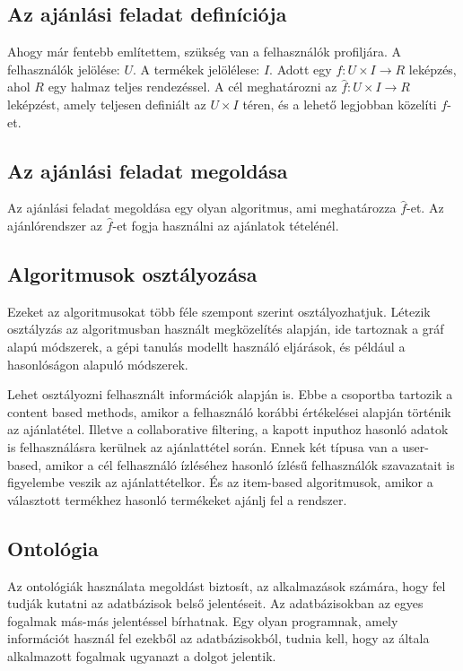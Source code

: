 \subsection{Az ajánlási feladat definíciója}

Ahogy már fentebb említettem, szükség van a felhasználók profiljára. A felhasználók jelölése: $U$. A termékek jelölélese: $I$. Adott egy $f: U \times I \rightarrow R$ leképzés, ahol $R$ egy halmaz teljes rendezéssel. A cél meghatározni az $\hat{f}: U \times I \rightarrow R$ leképzést, amely teljesen definiált az $U \times I$ téren, és a lehető legjobban közelíti $f$-et.

\subsection{Az ajánlási feladat megoldása}

Az ajánlási feladat megoldása egy olyan algoritmus, ami meghatározza $\hat{f}$-et. Az ajánlórendszer az $\hat{f}$-et fogja használni az ajánlatok tételénél.

\subsection{Algoritmusok osztályozása}

Ezeket az algoritmusokat több féle szempont szerint osztályozhatjuk. Létezik osztályzás az algoritmusban használt megközelítés alapján, ide tartoznak a gráf alapú módszerek, a gépi tanulás modellt használó eljárások, és például a hasonlóságon alapuló módszerek.

Lehet osztályozni felhasznált információk alapján is. Ebbe a csoportba tartozik a content based methods, amikor a felhasználó korábbi értékelései alapján történik az ajánlatétel. Illetve a collaborative filtering, a kapott inputhoz hasonló adatok is felhasználásra kerülnek az ajánlattétel során. Ennek két típusa van a user-based, amikor a cél felhasználó ízléséhez hasonló ízlésű felhasználók szavazatait is figyelembe veszik az ajánlattételkor. És az item-based algoritmusok, amikor a választott termékhez hasonló termékeket ajánlj fel a rendszer.

\subsection{Ontológia}

Az ontológiák használata megoldást biztosít, az alkalmazások számára, hogy fel tudják kutatni az adatbázisok belső jelentéseit. Az adatbázisokban az egyes fogalmak más-más jelentéssel bírhatnak. Egy olyan programnak, amely információt használ fel ezekből az adatbázisokból, tudnia kell, hogy az általa alkalmazott fogalmak ugyanazt a dolgot jelentik.

